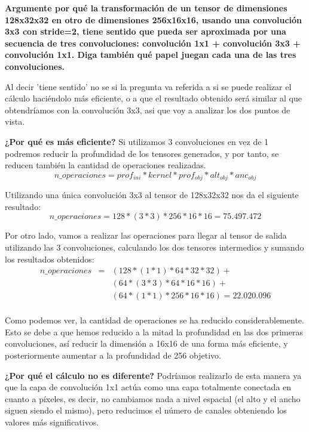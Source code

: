 \documentclass[11pt,a4paper]{article}
\begin{document}
\textbf{Argumente por qué la transformación de un tensor de dimensiones 128x32x32 en otro de dimensiones 256x16x16, usando una convolución 3x3 con stride=2, tiene sentido
que pueda ser aproximada por una secuencia de tres convoluciones: convolución 1x1 + convolución 3x3 + convolución 1x1. Diga también qué papel juegan cada una de las tres
convoluciones.}

Al decir 'tiene sentido' no se si la pregunta va referida a si se puede realizar el cálculo haciéndolo más eficiente, o a que el resultado obtenido será similar al que
obtendríamos con la convolución 3x3, asi que voy a analizar los dos puntos de vista.

\textbf{¿Por qué es más eficiente?} Si utilizamos 3 convoluciones en vez de 1 podremos reducir la profundidad de los tensores generados, y por tanto, se reducen también
la cantidad de operaciones realizadas.
\begin{equation}
	n\_operaciones = prof_{ini} * kernel * prof_{obj} * alt_{obj} * anc_{obj}
\end{equation}

Utilizando una única convolución 3x3 al tensor de 128x32x32 nos da el siguiente resultado:
\begin{equation}
	n\_operaciones = 128 * (3*3) * 256 * 16 * 16 = 75.497.472
\end{equation}

Por otro lado, vamos a realizar las operaciones para llegar al tensor de salida utilizando las 3 convoluciones, calculando los dos tensores intermedios y sumando los
resultados obtenidos:
\begin{eqnarray*}
	n\_operaciones & = & (128 * (1*1) * 64 * 32 * 32) + \\
	& & (64 * (3*3) * 64 * 16 * 16) + \\
	& & (64 * (1*1) * 256 * 16 * 16) = 22.020.096 \\
\end{eqnarray*}

Como podemos ver, la cantidad de operaciones se ha reducido considerablemente. Esto se debe a que hemos reducido a la mitad la profundidad en las dos primeras convoluciones,
así reducir la dimensión a 16x16 de una forma más eficiente, y posteriormente aumentar a la profundidad de 256 objetivo.

\textbf{¿Por qué el cálculo no es diferente?} Podríamos realizarlo de esta manera ya que la capa de convolución 1x1 actúa como una capa totalmente conectada en cuanto a píxeles,
es decir, no cambiamos nada a nivel espacial (el alto y el ancho siguen siendo el mismo), pero reducimos el número de canales obteniendo los valores más significativos.
\end{document}
